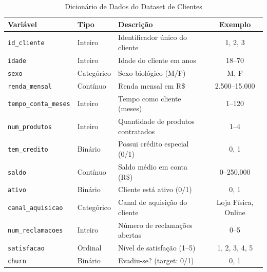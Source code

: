 \begin{table}[htbp]
\centering
\caption{Dicionário de Dados do Dataset de Clientes}
\label{tab:dicionario}
\small
\begin{tabular}{l l p{5.5cm} c}
\toprule
\textbf{Variável} & \textbf{Tipo} & \textbf{Descrição} & \textbf{Exemplo} \\
\midrule
\texttt{id\_cliente} & Inteiro & Identificador único do cliente & 1, 2, 3 \\
\texttt{idade} & Inteiro & Idade do cliente em anos & 18--70 \\
\texttt{sexo} & Categórico & Sexo biológico (M/F) & M, F \\
\texttt{renda\_mensal} & Contínuo & Renda mensal em R\$ & 2.500--15.000 \\
\texttt{tempo\_conta\_meses} & Inteiro & Tempo como cliente (meses) & 1--120 \\
\texttt{num\_produtos} & Inteiro & Quantidade de produtos contratados & 1--4 \\
\texttt{tem\_credito} & Binário & Possui crédito especial (0/1) & 0, 1 \\
\texttt{saldo} & Contínuo & Saldo médio em conta (R\$) & 0--250.000 \\
\texttt{ativo} & Binário & Cliente está ativo (0/1) & 0, 1 \\
\texttt{canal\_aquisicao} & Categórico & Canal de aquisição do cliente & Loja Física, Online \\
\texttt{num\_reclamacoes} & Inteiro & Número de reclamações abertas & 0--5 \\
\texttt{satisfacao} & Ordinal & Nível de satisfação (1--5) & 1, 2, 3, 4, 5 \\
\texttt{churn} & Binário & Evadiu-se? (target: 0/1) & 0, 1 \\
\bottomrule
\end{tabular}
\vspace{2mm}
\end{table}